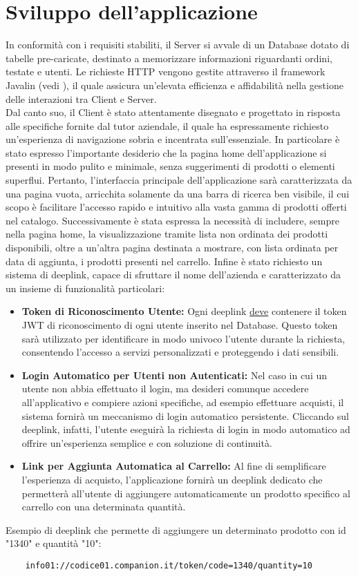 \chapter{Sviluppo dell'applicazione} \label{chapter_sviluppo_app}
In conformità con i requisiti stabiliti, il Server si avvale di un Database dotato di tabelle pre-caricate, destinato a memorizzare informazioni riguardanti ordini, testate e utenti. Le richieste HTTP vengono gestite attraverso il framework Javalin (vedi ), il quale assicura un'elevata efficienza e affidabilità nella gestione delle interazioni tra Client e Server.\\
Dal canto suo, il Client è stato attentamente disegnato e progettato in risposta alle specifiche fornite dal tutor aziendale, il quale ha espressamente richiesto un'esperienza di navigazione sobria e incentrata sull'essenziale. In particolare è stato espresso l'importante desiderio che la pagina home dell'applicazione si presenti in modo pulito e minimale, senza suggerimenti di prodotti o elementi superflui. Pertanto, l'interfaccia principale dell'applicazione sarà caratterizzata da una pagina vuota, arricchita solamente da una barra di ricerca ben visibile, il cui scopo è facilitare l'accesso rapido e intuitivo alla vasta gamma di prodotti offerti nel catalogo. Successivamente è stata espressa la necessità di includere, sempre nella pagina home, la visualizzazione tramite lista non ordinata dei prodotti disponibili, oltre a un'altra pagina destinata a mostrare, con lista ordinata per data di aggiunta, i prodotti presenti nel carrello. Infine è stato richiesto un sistema di deeplink, capace di sfruttare il nome dell'azienda e caratterizzato da un insieme di funzionalità particolari:
\begin{itemize}
	\item \textbf{Token di Riconoscimento Utente:} Ogni deeplink \underline{deve} contenere il token JWT di riconoscimento di ogni utente inserito nel Database. Questo token sarà utilizzato per identificare in modo univoco l'utente durante la richiesta, consentendo l'accesso a servizi personalizzati e proteggendo i dati sensibili.
	\item \textbf{Login Automatico per Utenti non Autenticati:} Nel caso in cui un utente non abbia effettuato il login, ma desideri comunque accedere all'applicativo e compiere azioni specifiche, ad esempio effettuare acquisti, il sistema fornirà un meccanismo di login automatico persistente. Cliccando sul deeplink, infatti, l'utente eseguirà la richiesta di login in modo automatico ad offrire un'esperienza semplice e con soluzione di continuità.
	\item \textbf{Link per Aggiunta Automatica al Carrello:} Al fine di semplificare l'esperienza di acquisto, l'applicazione fornirà un deeplink dedicato che permetterà all'utente di aggiungere automaticamente un prodotto specifico al carrello con una determinata quantità.
\end{itemize}

\noindent
Esempio di deeplink che permette di aggiungere un determinato prodotto con id "1340" e quantità "10":
\begin{lstlisting}
	info01://codice01.companion.it/token/code=1340/quantity=10
\end{lstlisting}


